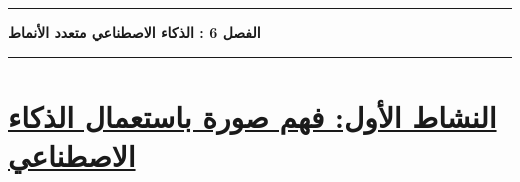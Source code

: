 \documentclass[a4paper]{article}
\begin{document}
\rule{\textwidth}{1pt}

\begin{center}

{\khatt\textbf{
الفصل 6 : الذكاء الاصطناعي متعدد الأنماط
}}

\end{center}

\rule{\textwidth}{1pt}






\section*{\khatt\underline{النشاط الأول: فهم صورة باستعمال الذكاء الاصطناعي}}
\end{document}
